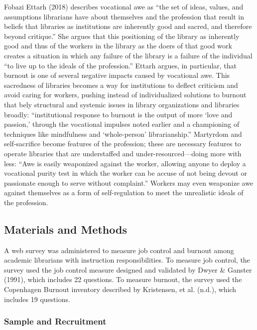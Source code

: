 \documentclass[
  twocolumn]{article}
\begin{document}
Fobazi Ettarh (2018) describes vocational awe as ``the set of ideas,
values, and assumptions librarians have about themselves and the
profession that result in beliefs that libraries as institutions are
inherently good and sacred, and therefore beyond critique.'' She argues
that this positioning of the library as inherently good and thus of the
workers in the library as the doers of that good work creates a
situation in which any failure of the library is a failure of the
individual ``to live up to the ideals of the profession.'' Ettarh
argues, in particular, that burnout is one of several negative impacts
caused by vocational awe. This sacredness of libraries becomes a way for
institutions to deflect criticism and avoid caring for workers, pushing
instead of individualized solutions to burnout that bely structural and
systemic issues in library organizations and libraries broadly:
``institutional response to burnout is the output of more `love and
passion,' through the vocational impulses noted earlier and a
championing of techniques like mindfulness and `whole-person'
librarianship.'' Martyrdom and self-sacrifice become features of the
profession; these are necessary features to operate libraries that are
understaffed and under-resourced---doing more with less: ``Awe is easily
weaponized against the worker, allowing anyone to deploy a vocational
purity test in which the worker can be accuse of not being devout or
passionate enough to serve without complaint.'' Workers may even
weaponize awe against themselves as a form of self-regulation to meet
the unrealistic ideals of the profession.

\subsection{Materials and Methods}\label{materials-and-methods}

A web survey was administered to measure job control and burnout among
academic librarians with instruction responsibilities. To measure job
control, the survey used the job control measure designed and validated
by Dwyer \& Ganster (1991), which includes 22 questions. To measure
burnout, the survey used the Copenhagen Burnout inventory described by
Kristensen, et al. (n.d.), which includes 19 questions.

\subsubsection{Sample and Recruitment}\label{sample-and-recruitment}
\end{document}
